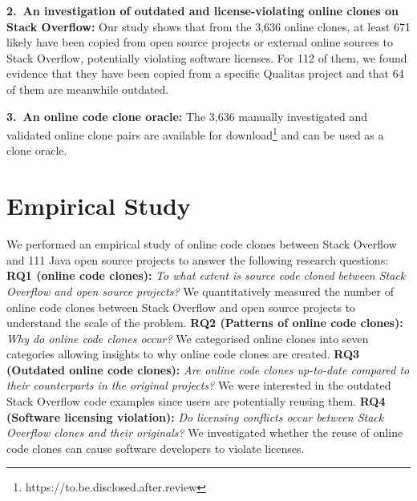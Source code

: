 \documentclass[sigconf,review, anonymous]{acmart}
\begin{document}
\vspace{0.5ex}%
\noindent\textbf{2.~An investigation of outdated and license-violating
  online clones on Stack Overflow:} Our study shows that from the
3,636 online clones, at least 671 likely have been copied from open
source projects or external online sources to Stack Overflow,
potentially violating software licenses. For 112 of them, we found
evidence that they have been copied from a specific Qualitas project
and that 64 of them are meanwhile outdated.

\vspace{0.5ex}%
\noindent\textbf{3.~An online code clone oracle:} The 3,636 manually
investigated and validated online clone pairs are available for
download\footnote{https://to.be.disclosed.after.review} and can be
used as a clone oracle.

\section{Empirical Study}

We performed an empirical study of online code clones between Stack
Overflow and 111 Java open source projects to answer the following
research questions: \\
%
\textbf{RQ1 (online code clones):} \textit{To what extent is source
  code cloned between Stack Overflow and open source projects?} We
quantitatively measured the number of online code clones between Stack
Overflow and open source projects to understand the scale of the
problem. \newline 
%
\textbf{RQ2 (Patterns of online code clones):} \textit{Why do online
  code clones occur?} We categorised online clones into seven
categories allowing insights to why online code clones are created.
\newline
%
\textbf{RQ3 (Outdated online code clones):} \textit{Are
  online code clones up-to-date compared to their counterparts in the
  original projects?} We were interested in the outdated Stack
Overflow code examples since users are potentially reusing
them. \newline
%
\textbf{RQ4 (Software licensing violation):} \textit{Do
  licensing conflicts occur between Stack Overflow clones and their
  originals?} We investigated whether the reuse of online code clones
can cause software developers to violate licenses.
\end{document}
